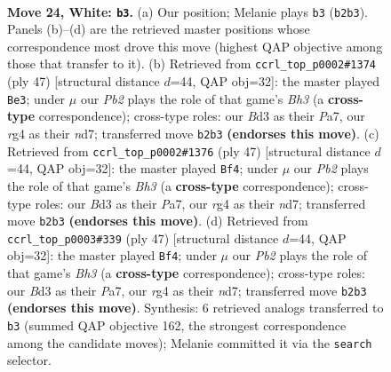 \documentclass[11pt]{article}
\begin{document}
\clearpage

\begin{figure}[p]\centering
\begin{subfigure}{0.46\textwidth}\centering
\resizebox{\linewidth}{!}{%
\newchessgame
\chessboard[
  setfen={rnb5/4kp2/1p2p3/p3P3/P5r1/2NB2P1/1P3P2/R2R2K1 w - - 1 24},
  showmover=false,
  pgfstyle=straightmove, color=movearrow, markmove={b2-b3}
]}
\caption{}
\end{subfigure}\hfill
\begin{subfigure}{0.46\textwidth}\centering
\resizebox{\linewidth}{!}{%
\newchessgame
\chessboard[
  setfen={r1r3k1/p2N1p2/2pR2pb/4p2p/7P/1P3P2/P1P3P1/1K5R b - - 4 24},
  showmover=false,
  pgfstyle=straightmove, color=movearrow, markmove={h6-e3}
]}
\caption{}
\end{subfigure}
\\[4pt]
\begin{subfigure}{0.46\textwidth}\centering
\resizebox{\linewidth}{!}{%
\newchessgame
\chessboard[
  setfen={r1r3k1/p2N1p2/2pR2pb/4p2p/7P/1P3P2/P1P3P1/1K5R b - - 2 24},
  showmover=false,
  pgfstyle=straightmove, color=movearrow, markmove={h6-f4}
]}
\caption{}
\end{subfigure}\hfill
\begin{subfigure}{0.46\textwidth}\centering
\resizebox{\linewidth}{!}{%
\newchessgame
\chessboard[
  setfen={r1r3k1/p2N1p2/2pR2pb/4p2p/7P/1P3P2/P1P3P1/1K5R b - - 2 24},
  showmover=false,
  pgfstyle=straightmove, color=movearrow, markmove={h6-f4}
]}
\caption{}
\end{subfigure}
\caption{\textbf{Move 24, White: \texttt{b3}.} (a) Our position; Melanie plays \texttt{b3} (\texttt{b2b3}). Panels (b)--(d) are the retrieved master positions whose correspondence most drove this move (highest QAP objective among those that transfer to it). (b) Retrieved from \texttt{ccrl\_top\_p0002\#1374} (ply 47) [structural distance $d$=44, QAP obj=32]: the master played \texttt{Be3}; under $\mu$ our \emph{Pb2} plays the role of that game's \emph{Bh3} (a \textbf{cross-type} correspondence); cross-type roles: our \emph{B}d3 as their \emph{P}a7, our \emph{r}g4 as their \emph{n}d7; transferred move \texttt{b2b3} \textbf{(endorses this move)}. (c) Retrieved from \texttt{ccrl\_top\_p0002\#1376} (ply 47) [structural distance $d$=44, QAP obj=32]: the master played \texttt{Bf4}; under $\mu$ our \emph{Pb2} plays the role of that game's \emph{Bh3} (a \textbf{cross-type} correspondence); cross-type roles: our \emph{B}d3 as their \emph{P}a7, our \emph{r}g4 as their \emph{n}d7; transferred move \texttt{b2b3} \textbf{(endorses this move)}. (d) Retrieved from \texttt{ccrl\_top\_p0003\#339} (ply 47) [structural distance $d$=44, QAP obj=32]: the master played \texttt{Bf4}; under $\mu$ our \emph{Pb2} plays the role of that game's \emph{Bh3} (a \textbf{cross-type} correspondence); cross-type roles: our \emph{B}d3 as their \emph{P}a7, our \emph{r}g4 as their \emph{n}d7; transferred move \texttt{b2b3} \textbf{(endorses this move)}. Synthesis: 6 retrieved analogs transferred to \texttt{b3} (summed QAP objective 162, the strongest correspondence among the candidate moves); Melanie committed it via the \texttt{search} selector.}
\label{fig:thought-m46}
\end{figure}
\end{document}
